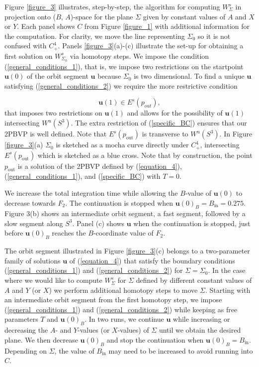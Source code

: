 \documentclass{ws-ijbc}
\begin{document}
Figure \ref{figure_3} illustrates, step-by-step, the algorithm for computing $W^s_\Sigma$ in projection onto ($B$, $A$)-space for the plane $\Sigma$ given by constant values of $A$ and $X$ or $Y$.  Each panel shows $C$ from Figure \ref{figure_1} with additional information for the computation.  For clarity, we move the line representing $\Sigma_0$ so it is not confused with $C^4_+$.  Panels \ref{figure_3}(a)-(c) illustrate the set-up for obtaining a first solution on $W^s_{\Sigma_0}$ via homotopy steps.  We impose the condition (\ref{general_conditions_1}), that is, we impose two restrictions on the startpoint $\mathbf{u}(0)$ of the orbit segment $\mathbf{u}$ because $\Sigma_0$ is two dimensional.  To find a unique $\mathbf{u}$ satisfying (\ref{general_conditions_2}) we require the more restrictive condition

\begin{equation}
	\mathbf{u}(1) \in E^s(p_{out}),
	\label{specific_BC}
\end{equation}
that imposes two restrictions on $\mathbf{u}(1)$ and allows for the possibility of $\mathbf{u}(1)$ intersecting $W^u(S^3)$.  The extra restriction of (\ref{specific_BC}) ensures that our 2PBVP is well defined.  Note that $E^s(p_{\text{out}})$ is transverse to $W^u(S^3)$.  In Figure \ref{figure_3}(a) $\Sigma_0$ is sketched as a mocha curve directly under $C^4_+$, intersecting $E^s(p_{\text{out}})$ which is sketched as a blue cross.  Note that by construction, the point $p_{\text{out}}$ is a solution of the 2PBVP defined by (\ref{equation_4}), (\ref{general_conditions_1}), and (\ref{specific_BC}) with $T=0$.

We increase the total integration time while allowing the $B$-value of $\mathbf{u}(0)$ to decrease towards $F_2$.  The continuation is stopped when $\mathbf{u}(0)_B = B_{\text{in}}=0.275$.  Figure 3(b) shows an intermediate orbit segment, a fast segment, followed by a slow segment along $S^3$.  Panel (c) shows $\mathbf{u}$ when the continuation is stopped, just before $\mathbf{u}(0)_B$ reaches the $B$-coordinate value of $F_2$.
    
The orbit segment illustrated in Figure \ref{figure_3}(c) belongs to a two-parameter family of solutions $\mathbf{u}$ of (\ref{equation_4}) that satisfy the boundary conditions (\ref{general_conditions_1}) and (\ref{general_conditions_2}) for $\Sigma=\Sigma_0$.  In the case where we would like to compute $W^{s}_{\Sigma}$ for $\Sigma$ defined by different constant values of $A$ and $Y$ (or $X$) we perform additional homotopy steps to move $\Sigma$.  Starting with an intermediate orbit segment from the first homotopy step, we impose (\ref{general_conditions_1}) and (\ref{general_conditions_2}) while keeping as free parameters $T$ and $\mathbf{u}(0)_B$.  In two runs, we continue $\mathbf{u}$ while increasing or decreasing the $A$- and $Y$-values (or $X$-values) of $\Sigma$ until we obtain the desired plane.  We then decrease $\mathbf{u}(0)_B$ and stop the continuation when $\mathbf{u}(0)_B = B_{\text{in}}$.  Depending on $\Sigma$, the value of $B_{\text{in}}$ may need to be increased to avoid running into $C$.
\end{document}
